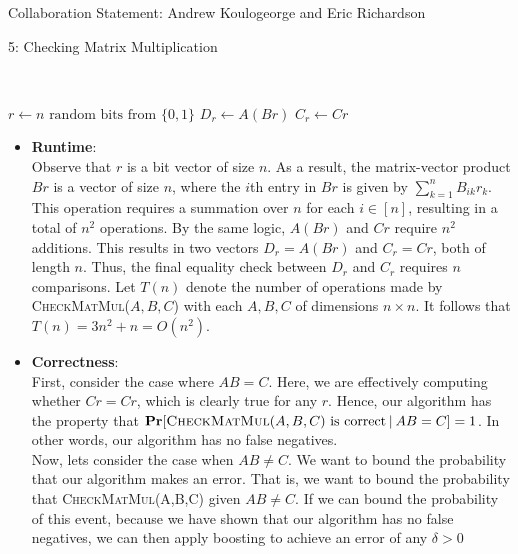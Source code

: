 \documentclass[12pt]{article}
\begin{document}

Collaboration Statement: Andrew Koulogeorge and Eric Richardson 


\begin{problem}{5: Checking Matrix Multiplication}
\end{problem}

\begin{solution} \ \\
    
\begin{answerbox}
\begin{algorithmic}
\State $r \gets \text{$n$ random bits from $\{0,1\}$}$
\State $D_r \gets A(Br)$
\State $C_r \gets Cr$
\State {}
\EndProcedure
\end{algorithmic}
\end{answerbox}

\begin{itemize}
    \item \textbf{Runtime}: \\
    Observe that $r$ is a bit vector of size $n$. As a result, the matrix-vector product $Br$ is a vector of size $n$, where the $i$th entry in $Br$ is given by $\sum\limits_{k=1}^n B_{ik}r_k$. This operation requires a summation over $n$ for each $i \in [n]$, resulting in a total of $n^2$ operations. By the same logic, $A(Br)$ and $Cr$ require $n^2$ additions. This results in two vectors $D_r = A(Br)$ and $C_r = Cr$, both of length $n$. Thus, the final equality check between $D_r$ and $C_r$ requires $n$ comparisons. Let $T(n)$ denote the number of operations made by \textsc{CheckMatMul}($A, B, C$) with each $A,B,C$ of dimensions $n \times n$. It follows that $T(n) = 3n^2 + n = O(n^2)$.
    \item \textbf{Correctness}: \\
    First, consider the case where $AB = C$. Here, we are effectively computing whether $Cr = Cr$, which is clearly true for any $r$. Hence, our algorithm has the property that $\textbf{Pr}[\textsc{CheckMatMul}(A,B,C) \text{ is correct} \hspace{2pt}|\hspace{2pt} AB = C] = 1$. In other words, our algorithm has no false negatives. \\
    
    Now, lets consider the case when $AB \neq C$. We want to bound the probability that our algorithm makes an error. That is, we want to bound the probability that \textsc{CheckMatMul}(A,B,C)  given $AB \neq C$. If we can bound the probability of this event, because we have shown that our algorithm has no false negatives, we can then apply boosting to achieve an error of any $\delta > 0$ 



\end{itemize}
\end{solution}
\end{document}
